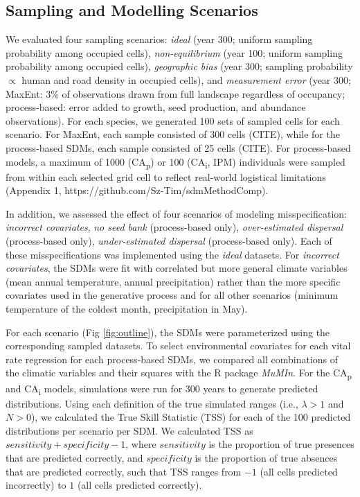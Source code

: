\documentclass[preprint,review,times,12pt]{elsarticle}
\begin{document}
\subsection{Sampling and Modelling Scenarios}
We evaluated four sampling scenarios: \emph{ideal} (year 300; uniform sampling probability among occupied cells), \emph{non-equilibrium} (year 100; uniform sampling probability among occupied cells), \emph{geographic bias} (year 300; sampling probability $\propto$ human and road density in occupied cells), and \emph{measurement error} (year 300; MaxEnt: 3\% of observations drawn from full landscape regardless of occupancy; process-based: error added to growth, seed production, and abundance observations). For each species, we generated 100 sets of sampled cells for each scenario. For MaxEnt, each sample consisted of 300 cells (CITE), while for the process-based SDMs, each sample consisted of 25 cells (CITE). For process-based models, a maximum of 1000 (CA\textsubscript{p}) or 100 (CA\textsubscript{i}, IPM) individuals were sampled from within each selected grid cell to reflect real-world logistical limitations (Appendix 1, https://github.com/Sz-Tim/sdmMethodComp). 

In addition, we assessed the effect of four scenarios of modeling misspecification: \emph{incorrect covariates}, \emph{no seed bank} (process-based only), \emph{over-estimated dispersal} (process-based only), \emph{under-estimated dispersal} (process-based only). Each of these misspecifications was implemented using the \emph{ideal} datasets. For \emph{incorrect covariates}, the SDMs were fit with correlated but more general climate variables (mean annual temperature, annual precipitation) rather than the more specific covariates used in the generative process and for all other scenarios (minimum temperature of the coldest month, precipitation in May).

For each scenario (Fig \ref{fig:outline}), the SDMs were parameterized using the corresponding sampled datasets. To select environmental covariates for each vital rate regression for each process-based SDMs, we compared all combinations of the climatic variables and their squares with the R package \emph{MuMIn}. For the CA\textsubscript{p} and CA\textsubscript{i} models, simulations were run for 300 years to generate predicted distributions. Using each definition of the true simulated ranges (i.e., $\lambda > 1$ and $N > 0$), we calculated the True Skill Statistic (TSS) for each of the 100 predicted distributions per scenario per SDM. We calculated TSS as $sensitivity + specificity - 1$, where $sensitivity$ is the proportion of true presences that are predicted correctly, and $specificity$ is the proportion of true absences that are predicted correctly, such that TSS ranges from $-1$ (all cells predicted incorrectly) to $1$ (all cells predicted correctly).
\end{document}
